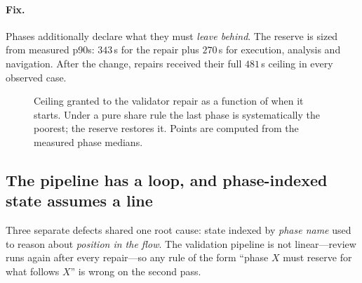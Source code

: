 \documentclass[11pt,a4paper]{article}
\begin{document}
\paragraph{Fix.} Phases additionally declare what they must \emph{leave behind}.
The reserve is sized from measured p90s: $343$\,s for the repair plus $270$\,s
for execution, analysis and navigation. After the change, repairs received their
full $481$\,s ceiling in every observed case.

\begin{figure}[t]
\centering
{}
\caption{Ceiling granted to the validator repair as a function of when it starts.
Under a pure share rule the last phase is systematically the poorest; the
reserve restores it. Points are computed from the measured phase medians.}
\label{fig:budget}
\end{figure}

\subsection{The pipeline has a loop, and phase-indexed state assumes a line}

Three separate defects shared one root cause: state indexed by \emph{phase name}
used to reason about \emph{position in the flow}. The validation pipeline is not
linear---review runs again after every repair---so any rule of the form ``phase
$X$ must reserve for what follows $X$'' is wrong on the second pass.
\end{document}
